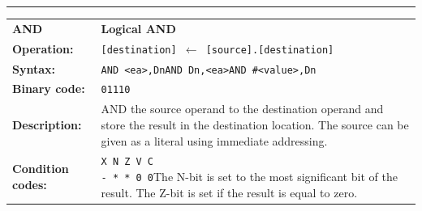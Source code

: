 \documentclass[]{article}
\begin{document}
\begin{appendices}
\noindent\rule{\textwidth}{1pt}\newline %
\setlength\extrarowheight{5pt} %
\begin{tabularx}{\textwidth}{lL}
  {\Large \textbf{AND}} 	& {\Large \textbf{Logical AND}}\\
  \textbf{Operation:} 		& \texttt{[destination] $\leftarrow$ [source].[destination]}\\
  \textbf{Syntax:}  		& \texttt{AND <ea>,Dn}\newline\texttt{AND Dn,<ea>}\newline\texttt{AND \#<value>,Dn}\\
  \textbf{Binary code:} 	& \texttt{01110}\\
  \textbf{Description:}  	& AND the source operand to the destination operand and store the
result in the destination location. The source can be given as a literal using immediate addressing.\\
  \textbf{Condition codes:} & \texttt{X N Z V C\newline - * * 0 0}\newline\newline The N-bit is set to the most significant bit of the result. The Z-bit is set if the result is equal to zero.\\
\end{tabularx}
\newline

\newpage


\end{appendices}
\end{document}
